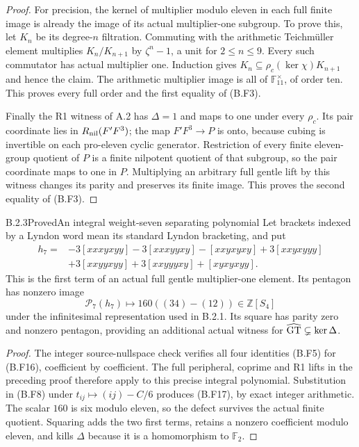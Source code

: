 \begin{proof}
For precision, the kernel of multiplier modulo eleven
in each full finite image is already the image of its
actual multiplier-one subgroup. To prove this, let $K_n$
be its degree-$n$ filtration. Commuting with the arithmetic
Teichm\"uller element multiplies $K_n/K_{n+1}$ by
$\zeta^n-1$, a unit for $2\le n\le9$. Every such
commutator has actual multiplier one. Induction gives
$K_n\subseteq\rho_c(\ker\chi)K_{n+1}$ and hence the
claim. The arithmetic multiplier image is all of
$\mathbb F_{11}^\times$, of order ten. This proves every
full order and the first equality of (B.F3).

Finally the R1 witness of A.2 has $\Delta=1$ and maps to
one under every $\rho_c$. Its pair coordinate lies in
$R_{\rm nil}(F'F^3)$; the map $F'F^3\to P$ is onto,
because cubing is invertible on each pro-eleven cyclic
generator. Restriction of every finite eleven-group
quotient of $P$ is a finite nilpotent quotient of that
subgroup, so the pair coordinate maps to one in $P$.
Multiplying an arbitrary full gentle lift by this witness
changes its parity and preserves its finite image. This
proves the second equality of (B.F3).
\end{proof}

\begin{result}{B.2.3}{Proved}{An integral weight-seven separating polynomial}
Let brackets indexed by a Lyndon word mean its standard
Lyndon bracketing, and put
\[
\begin{aligned}
 h_7={}&-3[xxxyxyy]-3[xxxyyxy]-[xxyxyxy]
       +3[xxyxyyy]\\
      &+3[xxyyxyy]+3[xxyyyxy]+[xyxyxyy].
\end{aligned}
\tag{B.F16}
\]
This is the first term of an actual full gentle
multiplier-one element. Its pentagon has nonzero image
\[
          \mathcal P_7(h_7)\longmapsto
                    160((34)-(12))\in\mathbb Z[S_4]
                                                               \tag{B.F17}
\]
under the infinitesimal representation used in B.2.1.
Its square has parity zero and nonzero pentagon, providing
an additional actual witness for $\widehat{\mathrm{GT}}\subsetneq\ker\Delta$.
\end{result}
\begin{proof}
The integer source-nullspace check verifies all four
identities (B.F5) for (B.F16), coefficient by coefficient.
The full peripheral, coprime and R1 lifts in the preceding
proof therefore apply to this precise integral polynomial.
Substitution in (B.F8) under $t_{ij}\mapsto(ij)-C/6$
produces (B.F17), by exact integer arithmetic. The scalar
$160$ is six modulo eleven, so the defect survives the
actual finite quotient. Squaring adds the two first terms,
retains a nonzero coefficient modulo eleven, and kills
$\Delta$ because it is a homomorphism to $\mathbb F_2$.
\end{proof}

